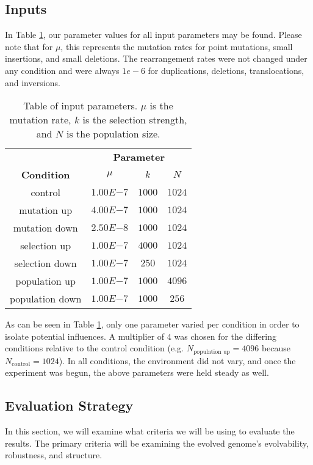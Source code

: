 \subsection{Inputs}
In Table \ref{table:parameters}, our parameter values for all input parameters may be found. Please note that for $\mu$, this represents the mutation rates for point mutations, small insertions, and small deletions. The rearrangement rates were not changed under any condition and were always $1e-6$ for duplications, deletions, translocations, and inversions. 

\begin{table}[h]
	\centering
	\begin{tabular}{|c||c|c|c|}
		\hline
		 & \multicolumn{3}{c|}{\textbf{Parameter}} \\
		\cline{2-4}
		\textbf{Condition} &$\mu$ & $k$ & $N$ \\
		\hline
		control & $1.00E{-7}$ & $1000$ & $1024$ \\
		\hline
		mutation up & $4.00E{-7}$ & $1000$ & $1024$ \\
		\hline
		mutation down & $2.50E{-8}$ & $1000$ & $1024$ \\
		\hline
		selection up & $1.00E{-7}$ & $4000$ & $1024$ \\
		\hline
		selection down & $1.00E{-7}$ & $250$ & $1024$ \\
		\hline
		population up & $1.00E{-7}$ & $1000$ & $4096$ \\
		\hline
		population down & $1.00E{-7}$ & $1000$ & $256$ \\		
		\hline
	\end{tabular}
	\caption[Table of parameters]{Table of input parameters. $\mu$ is the mutation rate, $k$ is the selection strength, and $N$ is the population size.}
	\label{table:parameters}
\end{table}
As can be seen in Table \ref{table:parameters}, only one parameter varied per condition in order to isolate potential influences. A multiplier of $4$ was chosen for the differing conditions relative to the control condition (e.g. $N_\text{population up} = 4096$ because $N_\text{control} = 1024$). In all conditions, the environment did not vary, and once the experiment was begun, the above parameters were held steady as well. 
\subsection{Evaluation Strategy}
In this section, we will examine what criteria we will be using to evaluate the results. The primary criteria will be examining the evolved genome's evolvability, robustness, and structure. 
